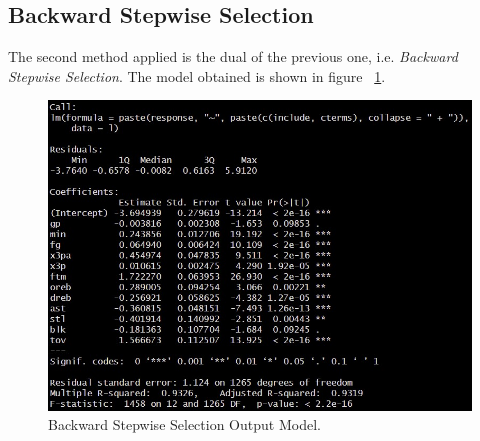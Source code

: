 \subsection{Backward Stepwise Selection}

The second method applied is the dual of the previous one, i.e. \textit{Backward Stepwise Selection}. The model obtained is shown in figure \Fig~\ref{fig:BackwardModelSummary}.
\begin{figure}[h]
	\centering
	\includegraphics[width=0.4\linewidth]{ImageFiles/Regression/Backward/BackwardModelSummary}
	\caption{Backward Stepwise Selection Output Model.}
	\label{fig:BackwardModelSummary}
\end{figure}